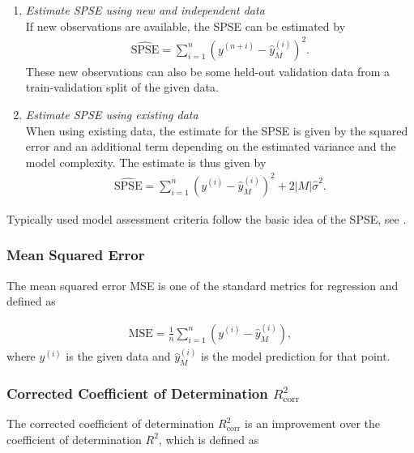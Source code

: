 \begin{enumerate}

	\item \emph{Estimate SPSE using new and independent data} \\	
	If new observations are available, the SPSE can be estimated by
	\begin{align}
		\widehat{\text{SPSE}} = \sum_{i=1}^n \left(y^{(n+i)} - \hat y^{(i)}_M\right)^2.
	\end{align}
	These new observations can also be some held-out validation data from a train-validation split of the given data. 
	
	\item \emph{Estimate SPSE using existing data} \\
	When using existing data, the estimate for the SPSE is given by the squared error and an additional  term depending on the estimated variance and the model complexity. The estimate is thus given by
	\begin{align}
		\widehat{\text{SPSE}} = \sum_{i=1}^n \left(y^{(i)} - \hat y^{(i)}_M\right)^2 + 2\vert M \vert \hat \sigma^2.
	\end{align}

\end{enumerate}

Typically used model assessment criteria follow the basic idea of the SPSE, see \cite{fahrmeir2007regression}.

\subsubsection{Mean Squared Error} 

The mean squared error MSE is one of the standard metrics for regression and defined as

\begin{align} \label{eq:MSE-DEF}
	\mathrm{MSE} = \frac{1}{n} \sum_{i=1}^n \left(y^{(i)} - \hat y^{(i)}_M \right),	
\end{align}
%
where $y^{(i)}$ is the given data and $\hat y^{(i)}_M$ is the model prediction for that point. 

\subsubsection{Corrected Coefficient of Determination $R_{\mathrm{corr}}^2$}

The corrected coefficient of determination $R^2_{\mathrm{corr}}$ is an improvement over the coefficient of determination $R^2$, which is defined as 

